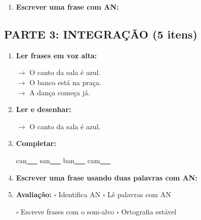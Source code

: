 \begin{exercicio}
\begin{enumerate}[resume]
  \item \textbf{Escrever uma frase com AN:}
  \begin{center}
  \underline{\hspace{12cm}}
  \end{center}

\end{enumerate}

\subsection*{PARTE 3: INTEGRAÇÃO (5 itens)}

\begin{enumerate}[resume]

  \item \textbf{Ler frases em voz alta:}
  \begin{center}
  $\rightarrow$ O canto da sala é azul.\\
  $\rightarrow$ O banco está na praça.\\
  $\rightarrow$ A dança começa já.\\
  \end{center}

  \item \textbf{Ler e desenhar:}
  \begin{center}
  $\rightarrow$ O canto da sala é azul.
  \end{center}
  \begin{center}
  \end{center}

  \item \textbf{Completar:}
  \begin{center}
  can\underline{~~~} \quad san\underline{~~~} \quad ban\underline{~~~} \quad cam\underline{~~~}
  \end{center}

  \item \textbf{Escrever uma frase usando duas palavras com AN:}
  \begin{center}
  \underline{\hspace{12cm}}
  \end{center}

  \item \textbf{Avaliação:} $\square$ Identifica AN \quad $\square$ Lê palavras com AN
  \begin{center}
  $\square$ Escreve frases com o som-alvo \quad $\square$ Ortografia estável
  \end{center}


\end{enumerate}
\end{exercicio}
